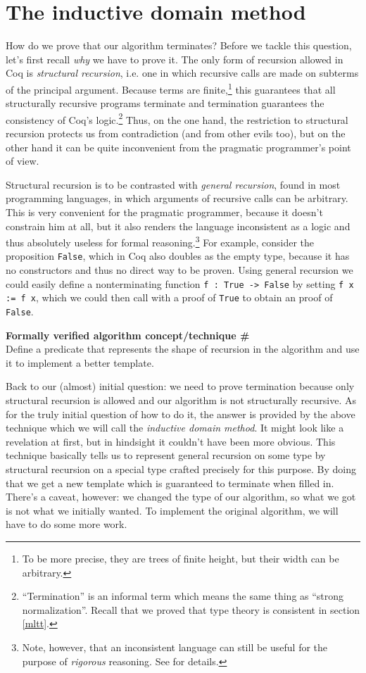 \documentclass[declaration,mgr,english,shortabstract]{iithesis}
\newcommand{\m}[1]{\texttt{#1}}
\newcounter{cnt}
\newcommand{\runcnt}{\#\arabic{cnt}}
\newcommand{\concept}[1]
{
    \refstepcounter{cnt}
    \begin{center}
        \textbf{Formally verified algorithm concept/technique \runcnt} \\
        #1
    \end{center}
}
\begin{document}
\section{The inductive domain method} \label{inductivedomain}

How do we prove that our algorithm terminates? Before we tackle this question, let's first recall \textit{why} we have to prove it. The only form of recursion allowed in Coq is \textit{structural recursion}, i.e. one in which recursive calls are made on subterms of the principal argument. Because terms are finite,\footnote{To be more precise, they are trees of finite height, but their width can be arbitrary.} this guarantees that all structurally recursive programs terminate and termination guarantees the consistency of Coq's logic.\footnote{``Termination'' is an informal term which means the same thing as ``strong normalization''. Recall that we proved that type theory is consistent in section \ref{mltt}.} Thus, on the one hand, the restriction to structural recursion protects us from contradiction (and from other evils too), but on the other hand it can be quite inconvenient from the pragmatic programmer's point of view.

Structural recursion is to be contrasted with \textit{general recursion}, found in most programming languages, in which arguments of recursive calls can be arbitrary. This is very convenient for the pragmatic programmer, because it doesn't constrain him at all, but it also renders the language inconsistent as a logic and thus absolutely useless for formal reasoning.\footnote{Note, however, that an inconsistent language can still be useful for the purpose of \textit{rigorous} reasoning. See \cite{FastAndLoose} for details.} For example, consider the proposition \m{False}, which in Coq also doubles as the empty type, because it has no constructors and thus no direct way to be proven. Using general recursion we could easily define a nonterminating function \m{f\ :\ True -> False} by setting \m{f x := f x}, which we could then call with a proof of \m{True} to obtain an proof of \m{False}.

\concept{Define a predicate that represents the shape of recursion in the algorithm and use it to implement a better template.}

Back to our (almost) initial question: we need to prove termination because only structural recursion is allowed and our algorithm is not structurally recursive. As for the truly initial question of how to do it, the answer is provided by the above technique which we will call the \textit{inductive domain method}. It might look like a revelation at first, but in hindsight it couldn't have been more obvious. This technique basically tells us to represent general recursion on some type by structural recursion on a special type crafted precisely for this purpose. By doing that we get a new template which is guaranteed to terminate when filled in. There's a caveat, however: we changed the type of our algorithm, so what we got is not what we initially wanted. To implement the original algorithm, we will have to do some more work.
\end{document}
